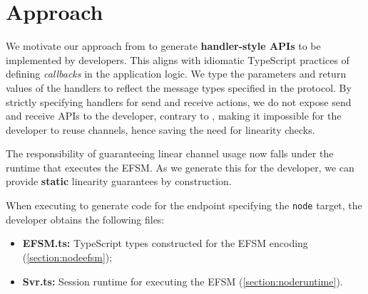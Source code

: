 \section{Approach}
\label{section:nodeapproach}

We motivate our approach from \cite{PureScript2019, HuJava}
to generate \textbf{handler-style APIs} to be implemented
by developers.
This aligns with idiomatic TypeScript practices of defining
\textit{callbacks} in the application logic.
We type the parameters and return values of the handlers to
reflect the message types specified in the protocol.
By strictly specifying handlers for send and receive actions,
we do not expose send and receive APIs to the developer,
contrary to \cite{HuJava},
making it impossible for the developer to reuse channels,
hence saving the need for linearity checks.

The responsibility of guaranteeing linear channel usage now falls
under the runtime that executes the EFSM.
As we generate this for the developer,
we can provide \textbf{static}
linearity guarantees by construction.

When executing \nodecodegen to generate code for the
 endpoint specifying the \texttt{node} target,
the developer obtains the following files:

\begin{itemize}
\item \textbf{EFSM.ts:} TypeScript types constructed for 
the EFSM encoding (\cref{section:nodeefsm});
\item \textbf{Svr.ts:} Session runtime for executing the EFSM 
(\cref{section:noderuntime}).
\end{itemize}